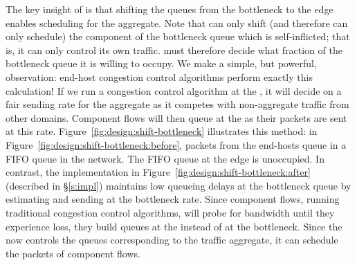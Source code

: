 The key insight of \name is that shifting the queues from the bottleneck to the edge enables scheduling for the aggregate.
Note that \name can only shift (and therefore can only schedule) the component of the bottleneck queue which is self-inflicted; that is, it can only control its own traffic.
\name must therefore decide what fraction of the bottleneck queue it is willing to occupy.
We make a simple, but powerful, observation: end-host congestion control algorithms perform exactly this calculation!
If we run a congestion control algorithm at the \name, it will decide on a fair sending rate for the aggregate as it competes with non-aggregate traffic from other domains.
Component flows will then queue at the \name as their packets are sent at this rate.
Figure~\ref{fig:design:shift-bottleneck} illustrates this method: 
in Figure~\ref{fig:design:shift-bottleneck:before}, packets from the end-hosts queue in a FIFO queue in the network. The FIFO queue at the edge is unoccupied.
In contrast, the \name implementation in Figure~\ref{fig:design:shift-bottleneck:after} (described in \S\ref{s:impl}) maintains low queueing delays at the bottleneck queue by estimating and sending at the bottleneck rate. 
Since component flows, running traditional congestion control algorithms, will probe for bandwidth until they experience loss, they build queues at the \name instead of at the bottleneck.
Since the \name now controls the queues corresponding to the traffic aggregate, it can schedule the packets of component flows.
